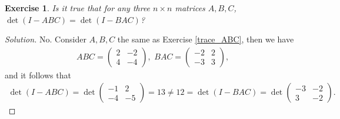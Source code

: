 \documentclass[10pt]{book}
\newtheorem{exercise}{Exercise}[section]
\theoremstyle{definition}
\numberwithin{equation}{chapter}
\begin{document}
\begin{exercise}
Is it true that for any three $n \times n$ matrices $A, B, C$, $\det (I - ABC) = \det (I - BAC)$?
\end{exercise}
\begin{proof}[Solution]
No. Consider $A, B, C$ the same as Exercise \ref{trace_ABC}, then we have
\begin{align*}
    ABC = \begin{pmatrix}
        2 & -2 \\
        4 & -4
    \end{pmatrix}, \,\, BAC = \begin{pmatrix}
        -2 & 2 \\
        -3 & 3
    \end{pmatrix},
\end{align*}
and it follows that
\begin{align*}
    \det (I - ABC) = \det \begin{pmatrix}
        -1 & 2 \\
        -4 & -5
    \end{pmatrix} = 13 \neq 12 = \det (I - BAC) = \det \begin{pmatrix}
        -3 & -2 \\
        3 & -2
    \end{pmatrix}.
\end{align*}
\end{proof}

\medskip
\end{document}

